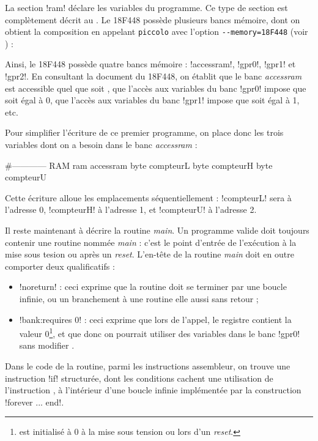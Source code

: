 La section \pic!ram! déclare les variables du programme. Ce type de section est complètement décrit au . Le 18F448 possède plusieurs bancs mémoire, dont on obtient la composition en appelant \texttt{piccolo} avec l'option \texttt{-{}-memory=18F448} (voir ) :


{\footnotesize }

Ainsi, le 18F448 possède quatre bancs mémoire : \pic!accessram!, \pic!gpr0!, \pic!gpr1! et \pic!gpr2!. En consultant la document du 18F448, on établit que le banc \emph{accessram} est accessible quel que soit , que l'accès aux variables du banc \pic!gpr0! impose que  soit égal à 0, que l'accès aux variables du banc \pic!gpr1! impose que  soit égal à 1, etc.

Pour simplifier l'écriture de ce premier programme, on place donc les trois variables dont on a besoin dans le banc \emph{accessram} :
\begin{piccolo}
#------------ RAM
ram accessram {
  byte compteurL
  byte compteurH
  byte compteurU
}
\end{piccolo}

Cette écriture alloue les emplacements séquentiellement : \pic!compteurL! sera à l'adresse 0, \pic!compteurH! à l'adresse 1, et \pic!compteurU! à l'adresse 2.

Il reste maintenant à décrire la routine \emph{main}. Un programme valide doit toujours contenir une routine nommée \emph{main} : c'est le point d'entrée de l'exécution à la mise sous tesion ou après un \emph{reset}. L'en-tête de la routine \emph{main} doit en outre comporter deux qualificatifs :
\begin{itemize}
  \item \pic!noreturn! : ceci exprime que la routine doit se terminer par une boucle infinie, ou un branchement à une routine elle aussi sans retour ;
  \item \pic!bank:requires 0! : ceci exprime que lors de l'appel, le registre  contient la valeur 0\footnote{ est initialisé à 0 à la mise sous tension ou lors d'un \emph{reset}.}, et que donc on pourrait utiliser des variables dans le banc \pic!gpr0! sans modifier .
\end{itemize}

Dans le code de la routine, parmi les instructions assembleur, on trouve une instruction \pic!if! structurée, dont les conditions cachent une utilisation de l’instruction , à l'intérieur d'une boucle infinie implémentée par la construction \pic!forever ... end!.

